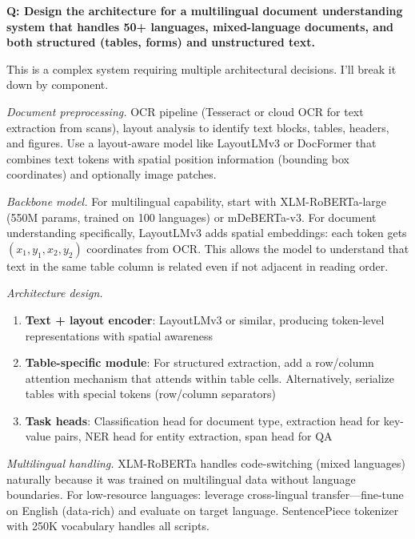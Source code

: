 \begin{interviewq}
\textbf{Q: Design the architecture for a multilingual document understanding system that handles 50+ languages, mixed-language documents, and both structured (tables, forms) and unstructured text.}

 \quad {} \quad \badgefreq{\freqmed}

\stronganswer This is a complex system requiring multiple architectural decisions. I'll break it down by component.

\textit{Document preprocessing.} OCR pipeline (Tesseract or cloud OCR for text extraction from scans), layout analysis to identify text blocks, tables, headers, and figures. Use a layout-aware model like LayoutLMv3 or DocFormer that combines text tokens with spatial position information (bounding box coordinates) and optionally image patches.

\textit{Backbone model.} For multilingual capability, start with XLM-RoBERTa-large (550M params, trained on 100 languages) or mDeBERTa-v3. For document understanding specifically, LayoutLMv3 adds spatial embeddings: each token gets $(x_1, y_1, x_2, y_2)$ coordinates from OCR. This allows the model to understand that text in the same table column is related even if not adjacent in reading order.

\textit{Architecture design.}
\begin{enumerate}
    \item \textbf{Text + layout encoder}: LayoutLMv3 or similar, producing token-level representations with spatial awareness
    \item \textbf{Table-specific module}: For structured extraction, add a row/column attention mechanism that attends within table cells. Alternatively, serialize tables with special tokens (row/column separators)
    \item \textbf{Task heads}: Classification head for document type, extraction head for key-value pairs, NER head for entity extraction, span head for QA
\end{enumerate}

\textit{Multilingual handling.} XLM-RoBERTa handles code-switching (mixed languages) naturally because it was trained on multilingual data without language boundaries. For low-resource languages: leverage cross-lingual transfer---fine-tune on English (data-rich) and evaluate on target language. SentencePiece tokenizer with 250K vocabulary handles all scripts.


\end{interviewq}
